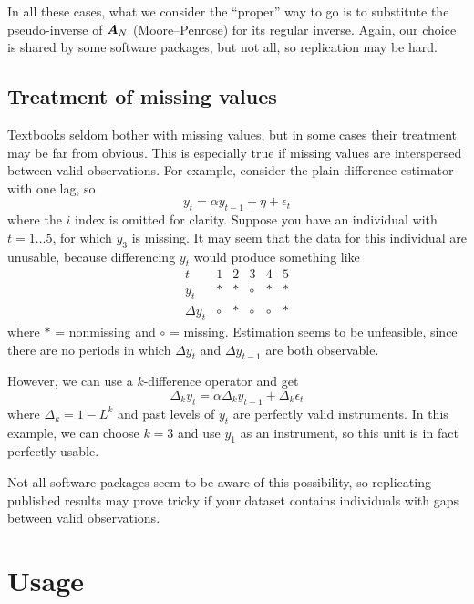In all these cases, what we consider the ``proper'' way to go is to
substitute the pseudo-inverse of $\boldsymbol{A}_N$ (Moore--Penrose) for its regular
inverse. Again, our choice is shared by some software packages, but
not all, so replication may be hard.


\subsection{Treatment of missing values}

Textbooks seldom bother with missing values, but in some cases their
treatment may be far from obvious. This is especially true if missing
values are interspersed between valid observations. For example,
consider the plain difference estimator with one lag, so
\[
y_t = \alpha y_{t-1} + \eta + \epsilon_t
\]
where the $i$ index is omitted for clarity. Suppose you have an
individual with $t=1\ldots5$, for which $y_3$ is missing. It may seem
that the data for this individual are unusable, because
differencing $y_t$ would produce something like
\[
\begin{array}{c|ccccc}
  t & 1 & 2 & 3 & 4 & 5 \\
  \hline
  y_t & * & * & \circ & * & * \\
  \Delta y_t & \circ & * & \circ & \circ & *
\end{array}
\]
where $*$ = nonmissing and $\circ$ = missing. Estimation seems to be
unfeasible, since there are no periods in which $\Delta y_t$ and
$\Delta y_{t-1}$ are both observable.

However, we can use a $k$-difference operator and get
\[
\Delta_k y_t = \alpha \Delta_k y_{t-1} + \Delta_k \epsilon_t
\]
where $\Delta_k = 1 - L^k$ and past levels of $y_t$ are perfectly
valid instruments. In this example, we can choose $k=3$ and use $y_1$
as an instrument, so this unit is in fact perfectly usable.

Not all software packages seem to be aware of this possibility, so
replicating published results may prove tricky if your dataset
contains individuals with gaps between valid observations.

\section{Usage}
\label{sec:dpanel-usage}

